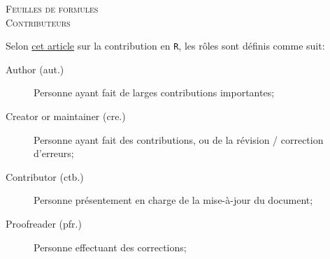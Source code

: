 \documentclass[10pt, french]{article}
\begin{document}
\center %

\textsc{\LARGE Feuilles de formules}\\[0.5cm]
\textsc{\Large Contributeurs}\\[0.5cm] 

\begin{terminologie}[Rôles]
Selon \href{https://journal.r-project.org/archive/2012-1/RJournal_2012-1_Hornik~et~al.pdf}{cet article} sur la contribution en \texttt{R}, les rôles sont définis comme suit:
\begin{description}
	\item[Author (aut.)]	Personne ayant fait de larges contributions importantes;
	\item[Creator or maintainer (cre.)]	Personne ayant fait des contributions, ou de la révision / correction d'erreurs;
	\item[Contributor (ctb.)]	Personne présentement en charge de la mise-à-jour du document;
	\item[Proofreader (pfr.)]	Personne effectuant des corrections;
\end{description}
\end{terminologie}
\end{document}
